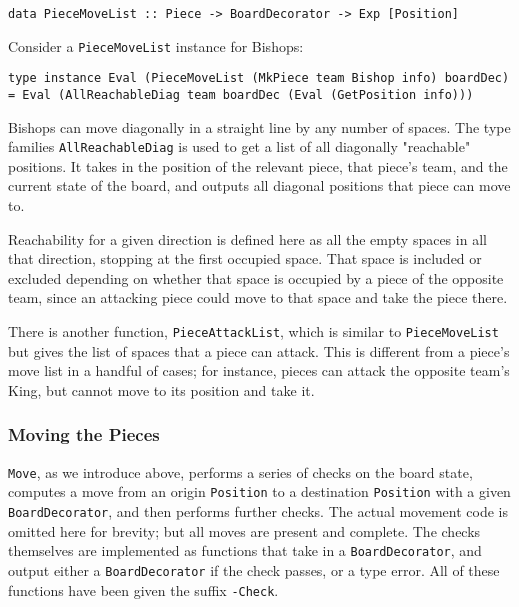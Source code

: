 \documentclass[12pt, a4paper, bibliography=totocnumbered]{scrartcl}
\begin{document}
\begin{lstlisting}
data PieceMoveList :: Piece -> BoardDecorator -> Exp [Position]
\end{lstlisting}

Consider a \lstinline[basicstyle=\ttfamily]{PieceMoveList} instance for Bishops:

\begin{lstlisting}
type instance Eval (PieceMoveList (MkPiece team Bishop info) boardDec) = Eval (AllReachableDiag team boardDec (Eval (GetPosition info)))
\end{lstlisting}

Bishops can move diagonally in a straight line by any number of spaces. The type families \lstinline[basicstyle=\ttfamily]{AllReachableDiag} is used to get a list of all diagonally "reachable" positions. It takes in the position of the relevant piece, that piece's team, and the current state of the board, and outputs all diagonal positions that piece can move to.

Reachability for a given direction is defined here as all the empty spaces in all that direction, stopping at the first occupied space. That space is included or excluded depending on whether that space is occupied by a piece of the opposite team, since an attacking piece could move to that space and take the piece there.

There is another function, \lstinline[basicstyle=\ttfamily]{PieceAttackList}, which is similar to \lstinline[basicstyle=\ttfamily]{PieceMoveList} but gives the list of spaces that a piece can attack. This is different from a piece's move list in a handful of cases; for instance, pieces can attack the opposite team's King, but cannot move to its position and take it.

\subsubsection{Moving the Pieces}

\lstinline[basicstyle=\ttfamily]{Move}, as we introduce above, performs a series of checks on the board state, computes a move from an origin \lstinline[basicstyle=\ttfamily]{Position} to a destination \lstinline[basicstyle=\ttfamily]{Position} with a given \lstinline[basicstyle=\ttfamily]{BoardDecorator}, and then performs further checks. The actual movement code is omitted here for brevity; but all moves are present and complete. The checks themselves are implemented as functions that take in a \lstinline[basicstyle=\ttfamily]{BoardDecorator}, and output either a \lstinline[basicstyle=\ttfamily]{BoardDecorator} if the check passes, or a type error. All of these functions have been given the suffix \lstinline{-Check}.
\end{document}
